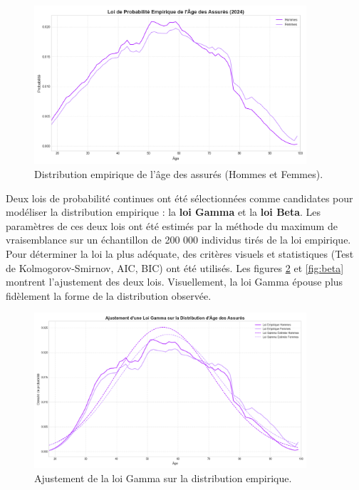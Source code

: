 \begin{figure}[H]
\centering
\includegraphics[width=0.9\textwidth]{images/2_chapitres/chapitre3/distribution_age_assures.png}
\caption{Distribution empirique de l'âge des assurés (Hommes et Femmes).}
\label{fig:empirique}
\end{figure}

Deux lois de probabilité continues ont été sélectionnées comme candidates pour modéliser la distribution empirique : la \textbf{loi Gamma} et la \textbf{loi Beta}. Les paramètres de ces deux lois ont été estimés par la méthode du maximum de vraisemblance sur un échantillon de 200 000 individus tirés de la loi empirique. Pour déterminer la loi la plus adéquate, des critères visuels et statistiques (Test de Kolmogorov-Smirnov, AIC, BIC) ont été utilisés. Les figures \ref{fig:gamma} et \ref{fig:beta} montrent l'ajustement des deux lois. Visuellement, la loi Gamma épouse plus fidèlement la forme de la distribution observée.

\begin{figure}[H]
\centering
\includegraphics[width=0.9\textwidth]{images/2_chapitres/chapitre3/estimation_loi_gamma.png}
\caption{Ajustement de la loi Gamma sur la distribution empirique.}
\label{fig:gamma}
\end{figure}

